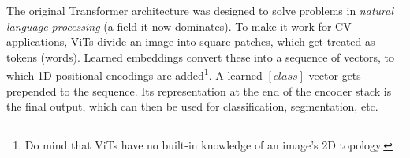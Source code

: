 The original Transformer architecture was designed to solve problems in \textit{natural language processing} (a field it now dominates). To make it work for CV applications, ViTs divide an image into square patches, which get treated as tokens (words). Learned embeddings convert these into a sequence of vectors, to which 1D positional encodings are added\footnote{Do mind that ViTs have no built-in knowledge of an image's 2D topology.}. A learned $[class]$ vector gets prepended to the sequence. Its representation at the end of the encoder stack is the final output, which can then be used for classification, segmentation, etc.






